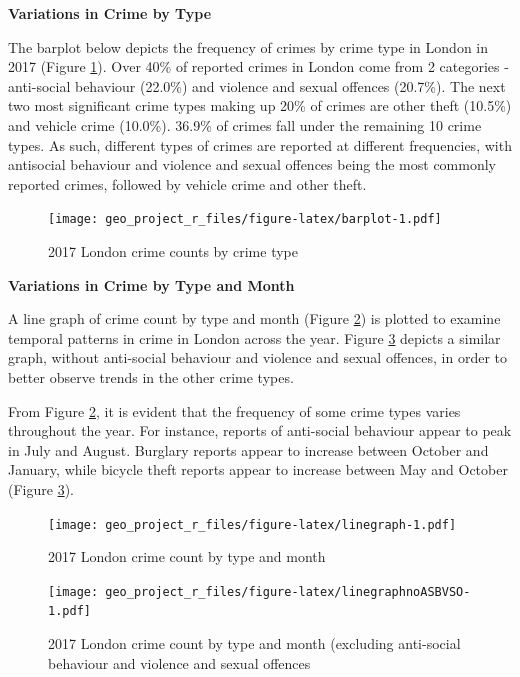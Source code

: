 \documentclass[]{article}
\theoremstyle{definition}
\theoremstyle{definition}
\theoremstyle{definition}
\theoremstyle{remark}
\begin{document}
\textbf{Variations in Crime by Type}

The barplot below depicts the frequency of crimes by crime type in
London in 2017 (Figure \ref{fig:barplot}). Over 40\% of reported crimes
in London come from 2 categories - anti-social behaviour (22.0\%) and
violence and sexual offences (20.7\%). The next two most significant
crime types making up 20\% of crimes are other theft (10.5\%) and
vehicle crime (10.0\%). 36.9\% of crimes fall under the remaining 10
crime types. As such, different types of crimes are reported at
different frequencies, with antisocial behaviour and violence and sexual
offences being the most commonly reported crimes, followed by vehicle
crime and other theft.

\begin{figure}
\centering
\texttt{[image: geo\_project\_r\_files/figure-latex/barplot-1.pdf]}
\caption{\label{fig:barplot}2017 London crime counts by crime type}
\end{figure}

\textbf{Variations in Crime by Type and Month}

A line graph of crime count by type and month (Figure
\ref{fig:linegraph}) is plotted to examine temporal patterns in crime in
London across the year. Figure \ref{fig:linegraphnoASBVSO} depicts a
similar graph, without anti-social behaviour and violence and sexual
offences, in order to better observe trends in the other crime types.

From Figure \ref{fig:linegraph}, it is evident that the frequency of
some crime types varies throughout the year. For instance, reports of
anti-social behaviour appear to peak in July and August. Burglary
reports appear to increase between October and January, while bicycle
theft reports appear to increase between May and October (Figure
\ref{fig:linegraphnoASBVSO}).

\begin{figure}
\centering
\texttt{[image: geo\_project\_r\_files/figure-latex/linegraph-1.pdf]}
\caption{\label{fig:linegraph}2017 London crime count by type and month}
\end{figure}

\begin{figure}
\centering
\texttt{[image: geo\_project\_r\_files/figure-latex/linegraphnoASBVSO-1.pdf]}
\caption{\label{fig:linegraphnoASBVSO}2017 London crime count by type and
month (excluding anti-social behaviour and violence and sexual offences}
\end{figure}
\end{document}
